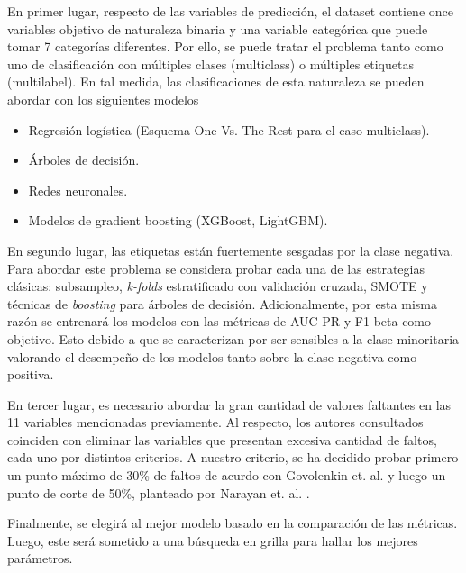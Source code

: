 \documentclass[conference]{IEEEtran}
\begin{document}
En primer lugar, respecto de las variables de predicción, el dataset contiene once variables objetivo de naturaleza binaria y una variable categórica que puede tomar 7 categorías diferentes. Por ello, se puede tratar el problema tanto como uno de clasificación
con múltiples clases (multiclass) o múltiples etiquetas (multilabel). En tal medida, las clasificaciones de esta naturaleza se pueden abordar con los siguientes modelos
\begin{itemize}
    \item Regresión logística (Esquema One Vs. The Rest para el caso multiclass).
    \item Árboles de decisión.
    \item Redes neuronales.
    \item Modelos de gradient boosting (XGBoost, LightGBM).
\end{itemize}

En segundo lugar, las etiquetas están fuertemente sesgadas por la clase negativa. Para abordar este problema se considera probar cada una de las estrategias clásicas: subsampleo, \textit{k-folds} estratificado con validación cruzada, SMOTE y técnicas de \textit{boosting} para árboles de decisión. Adicionalmente, por esta misma razón se entrenará los modelos con las métricas de AUC-PR y F1-beta como objetivo. Esto debido a que se caracterizan por ser sensibles a la clase minoritaria valorando el desempeño de los modelos tanto sobre la clase negativa como positiva\cite{b?}. 

En tercer lugar, es necesario abordar la gran cantidad de valores faltantes en las 11 variables mencionadas previamente. Al respecto, los autores consultados coinciden con eliminar las variables que presentan excesiva cantidad de faltos, cada uno por distintos criterios. A nuestro criterio, se ha decidido probar primero un punto máximo de 30\% de faltos de acurdo con Govolenkin et. al. \cite{b1} y luego un punto de corte de 50\%, planteado por Narayan et. al. \cite{b??}.

Finalmente, se elegirá al mejor modelo  basado en la comparación de las métricas. Luego, este será sometido a una búsqueda en grilla para hallar los mejores parámetros.
\end{document}
